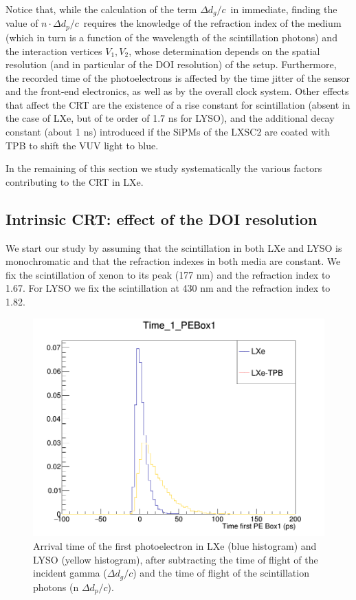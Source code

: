 \documentclass[review]{elsarticle}
\begin{document}
Notice that, while the calculation of the term $\Delta d_g/c$~in immediate, finding the value
of $n \cdot \Delta d_p/c$~requires the knowledge of the refraction index of the medium (which in turn is a function of the wavelength of the scintillation photons) and the interaction vertices $V_1,V_2$, whose determination depends on the spatial resolution (and in particular of the DOI resolution) of the setup. Furthermore, the recorded time of the photoelectrons is affected by the time jitter of the sensor and the front-end electronics, as well as by the overall clock system. Other effects that affect the CRT are the existence of a rise constant for scintillation (absent in the case of LXe, but of te order of 1.7 ns for LYSO), and the additional decay constant (about 1 ns) introduced if the SiPMs of the LXSC2 are coated with TPB to shift the VUV light to blue. 

In the remaining of this section we study systematically the various factors contributing to the CRT in LXe. 

\subsection*{Intrinsic CRT: effect of the DOI resolution}
We start our study by assuming that the scintillation in both LXe and LYSO is monochromatic and that the refraction indexes in both media are constant. We fix the scintillation of xenon to its peak (177 nm) and
the refraction index to 1.67. For LYSO we fix the scintillation at 430 nm and the refraction index to 1.82. 

\begin{figure}[!bhtp]
	\centering
	\includegraphics[scale=3]{../img/FirstPEScintLXeLYSO.png}
	\caption{\label{fig.firstPE} Arrival time of the first photoelectron in LXe (blue histogram) and LYSO (yellow histogram), after subtracting the time of flight of the incident gamma ($\Delta d_g/c$) and the time of flight of the scintillation photons (n \cdot $\Delta d_p/c$). }
\end{figure} 
\end{document}
